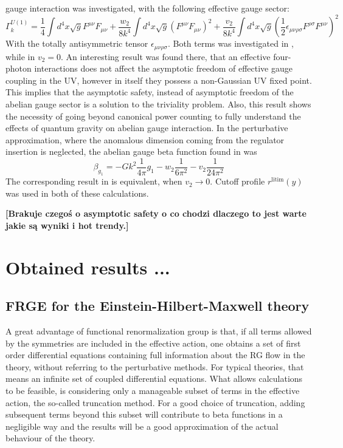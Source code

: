 \documentclass[11pt, a4paper]{article}
\newcommand{\jhkbf}[1]{\textbf{\color{red} [#1]}}
\begin{document}
gauge interaction was investigated, with the following effective gauge sector:
\begin{equation}
    \Gamma^{U(1)}_k = \frac{1}{4} \int d^4 x \sqrt{g} F^{\mu\nu} F_{\mu\nu} + \frac{w_2}{8 k^4} \int d^4 x \sqrt{g} \left(F^{\mu\nu} F_{\mu\nu}\right)^2 + \frac{v_2}{8k^4} \int d^4 x \sqrt{g} \left( \frac{1}{2} \epsilon_{\mu\nu\rho\sigma} F^{\rho\sigma} F^{\mu\nu} \right)^2
\end{equation}
With the totally antisymmetric tensor $\epsilon_{\mu\nu\rho\sigma}$.
Both terms was investigated in \cite{kwapisz_eichhorn}, while in \cite{christiansen_eichhorn} $v_2 = 0$.
An interesting result was found there, that an effective four-photon interactions does not affect the asymptotic freedom of effective gauge coupling
in the UV, however in itself they possess a non-Gaussian UV fixed point. This implies that the asymptotic safety, instead of asymptotic freedom
of the abelian gauge sector is a solution to the triviality problem. Also, this result shows
the necessity of going beyond canonical power counting to fully understand the effects of quantum gravity on abelian gauge interaction.
In the perturbative approximation, where the anomalous dimension coming from the regulator insertion is neglected,
the abelian gauge beta function found in \cite{kwapisz_eichhorn} was
\begin{equation}
    \beta_{g_1} = - Gk^2 \frac{1}{4\pi} g_1 - w_2 \frac{1}{6\pi^2} - v_2 \frac{1}{24\pi^2}
\end{equation}
The corresponding result in \cite{christiansen_eichhorn} is equivalent, when $v_2 \rightarrow 0$.
Cutoff profile $r^{\text{litim}}(y)$ was used in both of these calculations.

\jhkbf{Brakuje czegoś o asymptotic safety o co chodzi dlaczego to jest warte jakie są wyniki i hot trendy.}

\section{Obtained results ...}

\subsection{FRGE for the Einstein-Hilbert-Maxwell theory}

A great advantage of functional renormalization group is that, if all terms
allowed by the symmetries are included in the effective action, one obtains a set of first order
differential equations containing full information about the RG flow in the theory, without referring to the perturbative methods.
For typical theories, that means an infinite set of coupled differential equations.
What allows calculations to be feasible, is considering only a manageable subset of terms in the effective action, the so-called truncation method.
For a good choice of truncation, adding subsequent terms beyond this subset will contribute to beta functions in a negligible way
and the results will be a good approximation of the actual behaviour of the theory.
\end{document}
